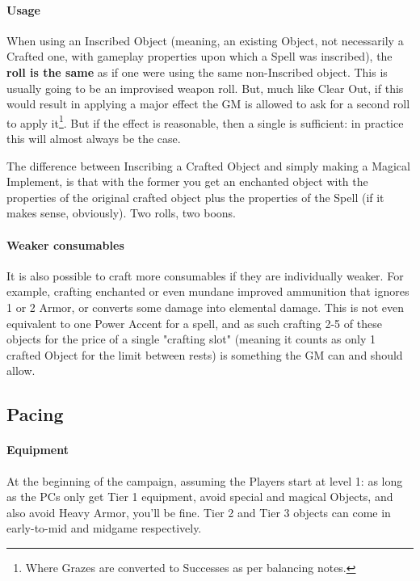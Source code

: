 \paragraph{Usage}

When using an Inscribed Object (meaning, an existing Object, not necessarily a Crafted one, with gameplay properties upon which a Spell was inscribed), the \textbf{roll is the same} as if one were using the same non-Inscribed object. This is usually going to be an improvised weapon roll. But, much like Clear Out, if this would result in applying a major effect the GM is allowed to ask for a second roll to apply it\footnote{Where Grazes are converted to Successes as per balancing notes.}. But if the effect is reasonable, then a single is sufficient: in practice this will almost always be the case.

The difference between Inscribing a Crafted Object and simply making a Magical Implement, is that with the former you get an enchanted object with the properties of the original crafted object plus the properties of the Spell (if it makes sense, obviously). Two rolls, two boons.


\paragraph{Weaker consumables}

\label{weaker_consumables}

It is also possible to craft more consumables if they are individually weaker. For example, crafting enchanted or even mundane improved ammunition that ignores 1 or 2 Armor, or converts some damage into elemental damage. This is not even equivalent to one Power Accent for a spell, and as such crafting 2-5 of these objects for the price of a single "crafting slot" (meaning it counts as only 1 crafted Object for the limit between rests) is something the GM can and should allow.


\subsection{Pacing}

\label{leveling_balancing}

\paragraph{Equipment}

At the beginning of the campaign, assuming the Players start at level 1: as long as the PCs only get Tier 1 equipment, avoid special and magical Objects, and also avoid Heavy Armor, you'll be fine. Tier 2 and Tier 3 objects can come in early-to-mid and midgame respectively.


